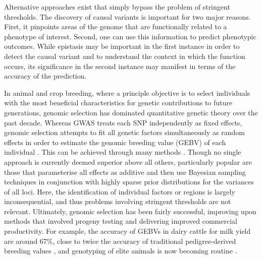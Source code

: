 Alternative approaches exist that simply bypass the problem of stringent thresholds. The discovery of causal variants is important for two major reasons. First, it pinpoints areas of the genome that are functionally related to a phenotype of interest. Second, one can use this information to predict phenotypic outcomes. While epistasis may be important in the first instance in order to detect the causal variant and to understand the context in which the function occurs, its significance in the second instance may manifest in terms of the accuracy of the prediction.

In animal and crop breeding, where a principle objective is to select individuals with the most beneficial characteristics for genetic contributions to future generations, genomic selection has dominated quantitative genetic theory over the past decade. Whereas GWAS treats each SNP independently as fixed effects, genomic selection attempts to fit all genetic factors simultaneously as random effects in order to estimate the genomic breeding value (GEBV) of each individual \citep{Meuwissen2001}. This can be achieved through many methods \citep{Gianola2009}. Though no single approach is currently deemed superior above all others, particularly popular are those that parameterise all effects as additive and then use Bayesian sampling techniques in conjunction with highly sparse prior distributions for the variances of all loci. Here, the identification of individual factors or regions is largely inconsequential, and thus problems involving stringent thresholds are not relevant. Ultimately, genomic selection has been fairly successful, improving upon methods that involved progeny testing and delivering improved commercial productivity. For example, the accuracy of GEBVs in dairy cattle for milk yield are around 67\%, close to twice the accuracy of traditional pedigree-derived breeding values \citep{Harris2008}, and genotyping of elite animals is now becoming routine \citep{Hayes2009}.

